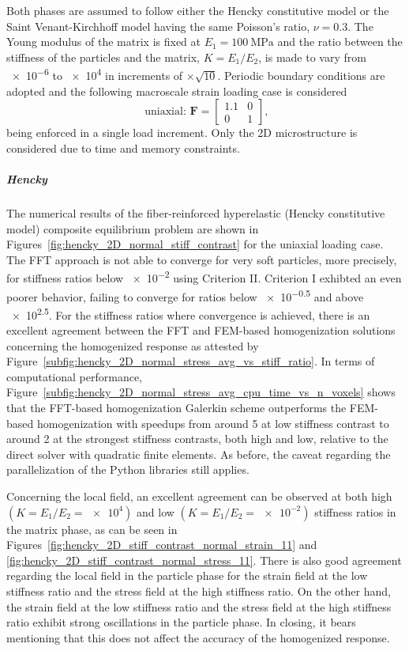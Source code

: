 Both phases are assumed to follow either the Hencky constitutive model or the Saint Venant-Kirchhoff model having the same Poisson's ratio, \(\nu=0.3\).
The Young modulus of the matrix is fixed at \(E_1=\SI{100}{\mega\pascal}\) and the ratio between the stiffness of the particles and the matrix, \(K=E_1/E_2\), is made to vary from \num{e-6} to \num{e4} in increments of \(\times \sqrt{10}\).
Periodic boundary conditions are adopted and the following macroscale strain loading case is considered
\begin{equation}
\text { uniaxial: } \bm{F}=\left[\begin{array}{cc}
1.1 & 0  \\
0 & 1
\end{array}\right],
\end{equation}
being enforced in a single load increment.
Only the 2D microstructure is considered due to time and memory constraints.

\subparagraph{Hencky}

The numerical results of the fiber-reinforced hyperelastic (Hencky constitutive model) composite equilibrium problem are shown in Figures~\ref{fig:hencky_2D_normal_stiff_contrast} for the uniaxial loading case.
The FFT approach is not able to converge for very soft particles, more precisely, for stiffness ratios below \num{e-2} using Criterion II.
Criterion I exhibted an even poorer behavior, failing to converge for ratios below \num{e-0.5} and above \num{e2.5}.
For the stiffness ratios where convergence is achieved, there is an excellent agreement between the FFT and FEM-based homogenization solutions concerning the homogenized response as attested by Figure~\ref{subfig:hencky_2D_normal_stress_avg_vs_stiff_ratio}.
In terms of computational performance, Figure~\ref{subfig:hencky_2D_normal_stress_avg_cpu_time_vs_n_voxels} shows that the FFT-based homogenization Galerkin scheme outperforms the FEM-based homogenization with speedups from around 5 at low stiffness contrast to around 2 at the strongest stiffness contrasts, both high and low, relative to the direct solver with quadratic finite elements.
As before, the caveat regarding the parallelization of the Python libraries still applies.

Concerning the local field, an excellent agreement can be observed at both high \((K=E_1/E_2=\num{e4})\) and low \((K=E_1/E_2=\num{e-2})\) stiffness ratios in the matrix phase, as can be seen in Figures~\ref{fig:hencky_2D_stiff_contrast_normal_strain_11} and \ref{fig:hencky_2D_stiff_contrast_normal_stress_11}.
There is also good agreement regarding the local field in the particle phase for the strain field at the low stiffness ratio and the stress field at the high stiffness ratio.
On the other hand, the strain field at the low stiffness ratio and the stress field at the high stiffness ratio exhibit strong oscillations in the particle phase.
In closing, it bears mentioning that this does not affect the accuracy of the homogenized response.

